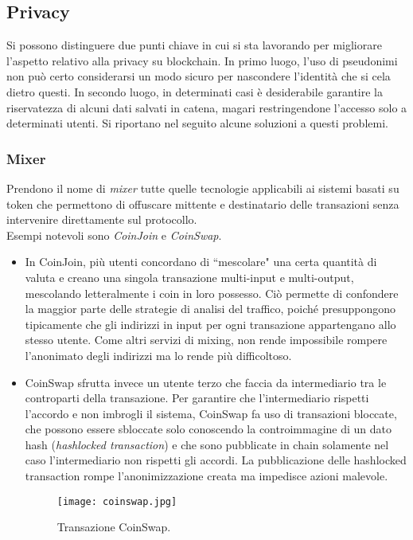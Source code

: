     \subsection{Privacy}
        Si possono distinguere due punti chiave in cui si sta lavorando per migliorare l'aspetto relativo alla privacy su blockchain. In primo luogo, l'uso di pseudonimi non può certo considerarsi un modo sicuro per nascondere l'identità che si cela dietro questi. In secondo luogo, in determinati casi è desiderabile garantire la riservatezza di alcuni dati salvati in catena, magari restringendone l'accesso solo a determinati utenti. Si riportano nel seguito alcune soluzioni a questi problemi.
        
        \subsubsection{Mixer}
            Prendono il nome di \emph{mixer} tutte quelle tecnologie applicabili ai sistemi basati su token che permettono di offuscare mittente e destinatario delle transazioni senza intervenire direttamente sul protocollo. \\
            Esempi notevoli sono \emph{CoinJoin} e \emph{CoinSwap}. \\
            \begin{itemize}
                \item In CoinJoin, più utenti concordano di ``mescolare" una certa quantità di valuta e creano una singola transazione multi-input e multi-output, mescolando letteralmente i coin in loro possesso. Ciò permette di confondere la maggior parte delle strategie di analisi del traffico, poiché presuppongono tipicamente che gli indirizzi in input per ogni transazione appartengano allo stesso utente. Come altri servizi di mixing, non rende impossibile rompere l'anonimato degli indirizzi ma lo rende più difficoltoso.
                \item CoinSwap sfrutta invece un utente terzo che faccia da intermediario tra le controparti della transazione. Per garantire che l'intermediario rispetti l'accordo e non imbrogli il sistema, CoinSwap fa uso di transazioni bloccate, che possono essere sbloccate solo conoscendo la controimmagine di un dato hash (\emph{hashlocked transaction}) e che sono pubblicate in chain solamente nel caso l'intermediario non rispetti gli accordi. La pubblicazione delle hashlocked transaction rompe l'anonimizzazione creata ma impedisce azioni malevole.
                \begin{figure}
                    \centering
                    \texttt{[image: coinswap.jpg]}
                    \caption[Transazione CoinSwap]{Transazione CoinSwap.}
                    \label{fig:coinswap}
                \end{figure}
            \end{itemize}
        
